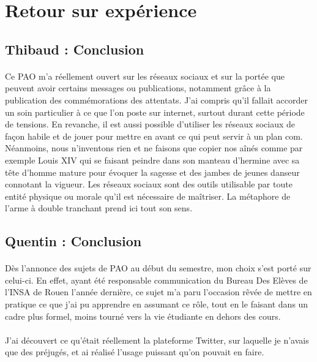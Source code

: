 \section{Retour sur expérience}
\subsection{Thibaud : Conclusion}

\paragraph{}
Ce PAO m'a réellement ouvert sur les réseaux sociaux et sur la portée que peuvent avoir certains messages ou publications, notamment grâce à la publication des commémorations des attentats. J'ai compris qu'il fallait 
accorder un soin particulier à ce que l'on poste sur internet, surtout durant cette période de tensions. En revanche, il est aussi possible d'utiliser les réseaux sociaux de façon habile et de jouer pour mettre en 
avant ce qui peut servir à un plan com.
Néanmoins, nous n'inventons rien et ne faisons que copier nos aînés comme par exemple Louis XIV qui se faisant peindre dans son manteau d'hermine avec sa tête d'homme mature pour évoquer la sagesse et des jambes 
de jeunes danseur connotant la vigueur.
Les réseaux sociaux sont des outils utilisable par toute entité physique ou morale qu'il est nécessaire de maîtriser. La métaphore de l'arme à double tranchant prend ici tout son sens.

\subsection{Quentin : Conclusion}

\paragraph{}
Dès l'annonce des sujets de PAO au début du semestre, mon choix s'est porté sur celui-ci. En effet, ayant été responsable communication du Bureau Des Elèves de l'INSA de Rouen l'année dernière, ce sujet m'a paru 
l'occasion rêvée de mettre en pratique ce que j'ai pu apprendre en assumant ce rôle, tout en le faisant dans un cadre plus formel, moins tourné vers la vie étudiante en dehors des cours.

\paragraph{}
J'ai découvert ce qu'était réellement la plateforme Twitter, sur laquelle je n'avais que des préjugés, et ai réalisé l'usage puissant qu'on pouvait en faire. 
